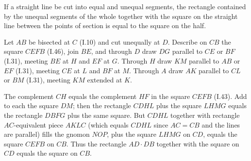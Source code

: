 \begin{claim}
\label{prop:II.5}
If a straight line be cut into equal and unequal segments, the
rectangle contained by the unequal segments of the whole together with
the square on the straight line between the points of section is equal
to the square on the half.
\end{claim}
\begin{evidence}[Proof of II.5]
\label{ev:II.5}
Let $AB$ be bisected at $C$ (I.10) and cut unequally at $D$.
Describe on $CB$ the square $CEFB$ (I.46), join $BE$, and through $D$
draw $DG$ parallel to $CE$ or $BF$ (I.31), meeting $BE$ at $H$ and
$EF$ at $G$.  Through $H$ draw $KM$ parallel to $AB$ or $EF$ (I.31),
meeting $CE$ at $L$ and $BF$ at $M$.  Through $A$ draw $AK$ parallel
to $CL$ or $BM$ (I.31), meeting $KM$ extended at $K$.

The complement $CH$ equals the complement $HF$ in the square $CEFB$
(I.43).  Add to each the square $DM$; then the rectangle $CDHL$ plus
the square $LHMG$ equals the rectangle $DBFG$ plus the same square.
But $CDHL$ together with rectangle $AC$-equivalent piece $AKLC$
(which equals $CDHL$ since $AC = CB$ and the lines are parallel)
fills the gnomon $NOP$, plus the square $LHMG$ on $CD$, equals the
square $CEFB$ on $CB$.  Thus the rectangle $AD\cdot DB$ together
with the square on $CD$ equals the square on $CB$.
\end{evidence}


